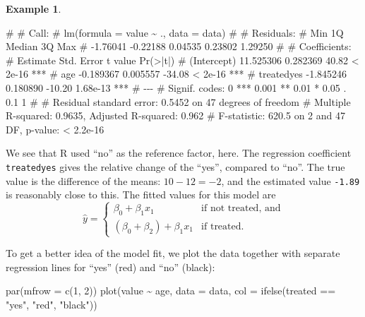 \documentclass[
  a4paper,
]{article}
\newenvironment{Shaded}{\begin{snugshade}}{\end{snugshade}}
\newcommand{\AttributeTok}[1]{\textcolor[rgb]{0.77,0.63,0.00}{#1}}
\newcommand{\DecValTok}[1]{\textcolor[rgb]{0.00,0.00,0.81}{#1}}
\newcommand{\FunctionTok}[1]{\textcolor[rgb]{0.00,0.00,0.00}{#1}}
\newcommand{\NormalTok}[1]{#1}
\newcommand{\SpecialCharTok}[1]{\textcolor[rgb]{0.00,0.00,0.00}{#1}}
\newcommand{\StringTok}[1]{\textcolor[rgb]{0.31,0.60,0.02}{#1}}
\theoremstyle{definition}
\theoremstyle{definition}
\newtheorem{example}{Example}[section]
\theoremstyle{definition}
\theoremstyle{definition}
\theoremstyle{remark}
\begin{document}
\begin{example}
\begin{Shaded}
\begin{Highlighting}[]
\NormalTok{\# }
\NormalTok{\# Call:}
\NormalTok{\# lm(formula = value \textasciitilde{} ., data = data)}
\NormalTok{\# }
\NormalTok{\# Residuals:}
\NormalTok{\#      Min       1Q   Median       3Q      Max }
\NormalTok{\# {-}1.76041 {-}0.22188  0.04535  0.23802  1.29250 }
\NormalTok{\# }
\NormalTok{\# Coefficients:}
\NormalTok{\#              Estimate Std. Error t value Pr(\textgreater{}|t|)    }
\NormalTok{\# (Intercept) 11.525306   0.282369   40.82  \textless{} 2e{-}16 ***}
\NormalTok{\# age         {-}0.189367   0.005557  {-}34.08  \textless{} 2e{-}16 ***}
\NormalTok{\# treatedyes  {-}1.845246   0.180890  {-}10.20 1.68e{-}13 ***}
\NormalTok{\# {-}{-}{-}}
\NormalTok{\# Signif. codes:  0 \textquotesingle{}***\textquotesingle{} 0.001 \textquotesingle{}**\textquotesingle{} 0.01 \textquotesingle{}*\textquotesingle{} 0.05 \textquotesingle{}.\textquotesingle{} 0.1 \textquotesingle{} \textquotesingle{} 1}
\NormalTok{\# }
\NormalTok{\# Residual standard error: 0.5452 on 47 degrees of freedom}
\NormalTok{\# Multiple R{-}squared:  0.9635,  Adjusted R{-}squared:  0.962 }
\NormalTok{\# F{-}statistic: 620.5 on 2 and 47 DF,  p{-}value: \textless{} 2.2e{-}16}
\end{Highlighting}
\end{Shaded}

We see that R used ``no'' as the reference factor, here. The
regression coefficient \texttt{treatedyes} gives the relative change
of the ``yes'', compared to ``no''. The true value is
the difference of the means: \(10 - 12 = -2\), and the estimated
value \texttt{-1.89} is reasonably close to this. The fitted values
for this model are
\begin{equation*}
  \hat y
  = \begin{cases}
    \beta_0 + \beta_1 x_1 & \mbox{if not treated, and} \\
    (\beta_0 + \beta_2) + \beta_1 x_1 & \mbox{if treated}.
  \end{cases}
\end{equation*}

To get a better
idea of the model fit, we plot the data together with
separate regression lines for ``yes'' (red) and ``no'' (black):

\begin{Shaded}
\begin{Highlighting}[]
\FunctionTok{par}\NormalTok{(}\AttributeTok{mfrow =} \FunctionTok{c}\NormalTok{(}\DecValTok{1}\NormalTok{, }\DecValTok{2}\NormalTok{))}
\FunctionTok{plot}\NormalTok{(value }\SpecialCharTok{\textasciitilde{}}\NormalTok{ age, }\AttributeTok{data =}\NormalTok{ data,}
     \AttributeTok{col =} \FunctionTok{ifelse}\NormalTok{(treated }\SpecialCharTok{==} \StringTok{"yes"}\NormalTok{, }\StringTok{"red"}\NormalTok{, }\StringTok{"black"}\NormalTok{))}


\end{Highlighting}
\end{Shaded}
\end{example}
\end{document}
